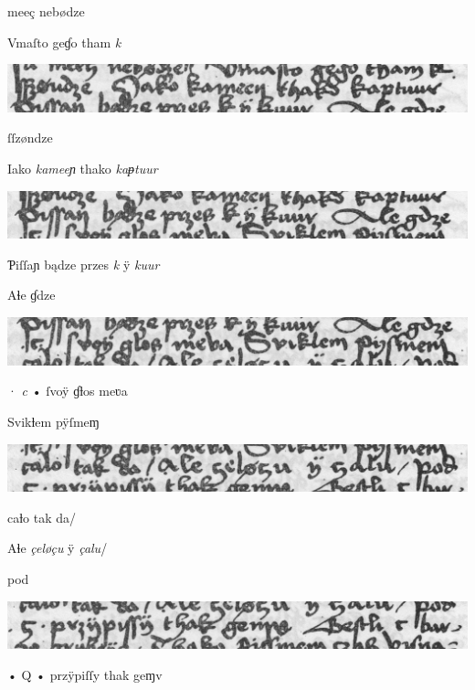 \splitverse

 meeç nebødze

\indentVerse Vmaſto geɠo tham \textit{k} 

\includegraphics[width=\hsize]{wierszP12}

\splitverse

ſſzøndze

\indentVerse Iako \textit{kameeɲ} thako \textit{kaᵽtuur} 

\newpage
\includegraphics[width=\hsize]{wierszP13}

\splitverse

Ƥiſſaɲ bądze przes \textit{k} ÿ \textit{kuur}

\indentVerse Aɬe ɠdze 

\includegraphics[width=\hsize]{wierszP14}

\splitverse

· \textit{c} • ſvoÿ ɠƚos meʋa

\indentVerse Svikƚem pÿſmeɱ  

\includegraphics[width=\hsize]{wierszP15}

\splitverse

caƚo tak da/

\indentVerse Aɬe \textit{çeløçu} ÿ \textit{çalu}/

\indentVerse  pod

\includegraphics[width=\hsize]{wierszP16}

\splitverse

  • Q • przÿpiſſy thak geɱv

